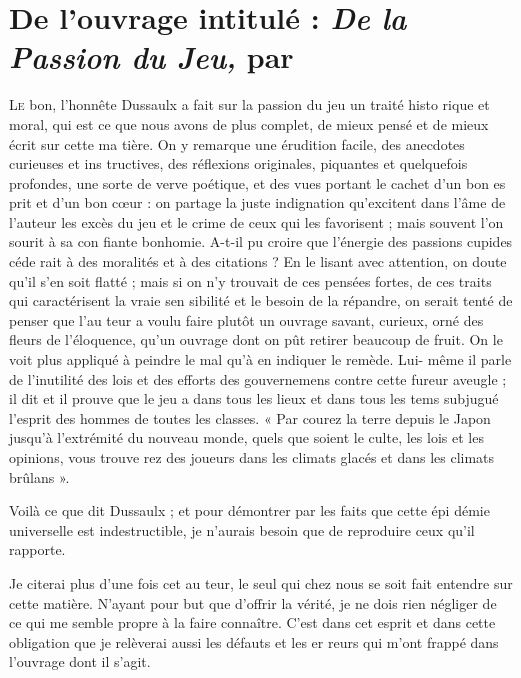 \chapter
  [De l'ouvrage intitulé : \emph{de la Passion du Jeu,} par Dussaulx]
  {De l'ouvrage intitulé : \emph{De la Passion du Jeu,} par }

\lettrine{L}{e} bon, l'honnête Dussaulx a fait
sur la passion du jeu un traité histo%
rique et moral, qui est ce que nous
avons de plus complet, de mieux
pensé et de mieux écrit sur cette ma%
tière. On y remarque une érudition
facile, des anecdotes curieuses et ins%
tructives, des réflexions originales,
piquantes et quelquefois profondes,
une sorte de verve poétique, et des
vues portant le cachet d'un bon es%
prit et d'un bon cœur : on partage
la juste indignation qu'excitent dans
l'âme de l'auteur les excès du jeu et
le crime de ceux qui les favorisent ;
mais souvent l'on sourit à sa con%
fiante bonhomie. A-t-il pu croire que
l'énergie des passions cupides céde%
rait à des moralités et à des citations ?
En le lisant avec attention, on doute
qu'il s'en soit flatté ; mais si on n'y
trouvait de ces pensées fortes, de ces
traits qui caractérisent la vraie sen%
sibilité et le besoin de la répandre,
on serait tenté de penser que l'au%
teur a voulu faire plutôt un ouvrage
savant, curieux, orné des fleurs de
l'éloquence, qu'un ouvrage dont on
pût retirer beaucoup de fruit. On le
voit plus appliqué à peindre le mal
qu'à en indiquer le remède. Lui-%
même il parle de l'inutilité des lois et
des efforts des gouvernemens contre
cette fureur aveugle ; il dit et il prouve
que le jeu a dans tous les lieux et dans
tous les tems subjugué l'esprit des
hommes de toutes les classes. « Par%
courez la terre depuis le Japon
jusqu'à l'extrémité du nouveau
monde, quels que soient le culte,
les lois et les opinions, vous trouve%
rez des joueurs dans les climats
glacés et dans les climats brûlans ».

Voilà ce que dit Dussaulx ; et pour
démontrer par les faits que cette épi%
démie universelle est indestructible,
je n'aurais besoin que de reproduire
ceux qu'il rapporte.

Je citerai plus d'une fois cet au%
teur, le seul qui chez nous se soit fait
entendre sur cette matière. N'ayant
pour but que d'offrir la vérité, je ne
dois rien négliger de ce qui me semble
propre à la faire connaître. C'est dans
cet esprit et dans cette obligation que
je relèverai aussi les défauts et les er%
reurs qui m'ont frappé dans l'ouvrage
dont il s'agit.

